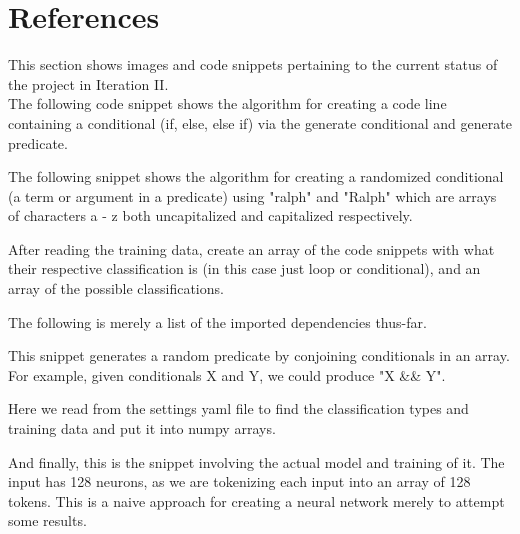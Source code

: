 \documentclass{article}
\begin{document}
    \section{References}
    This section shows images and code snippets pertaining to the current status of the project in Iteration II. \\

    The following code snippet shows the algorithm for creating a code line containing a conditional (if, else, else if) via the generate conditional and generate predicate.
    

    The following snippet shows the algorithm for creating a randomized conditional (a term or argument in a predicate) using "ralph" and "Ralph" which are arrays of characters a - z both uncapitalized and capitalized respectively.
    

    After reading the training data, create an array of the code snippets with what their respective classification is (in this case just loop or conditional), and an array of the possible classifications.
    

    The following is merely a list of the imported dependencies thus-far.
    

    This snippet generates a random predicate by conjoining conditionals in an array.
    For example, given conditionals X and Y, we could produce "X \&\& Y".
    

    Here we read from the settings yaml file to find the classification types and training data and put it into numpy arrays.
    

    And finally, this is the snippet involving the actual model and training of it.
    The input has 128 neurons, as we are tokenizing each input into an array of 128 tokens.
    This is a naive approach for creating a neural network merely to attempt some results.
    
\end{document}
